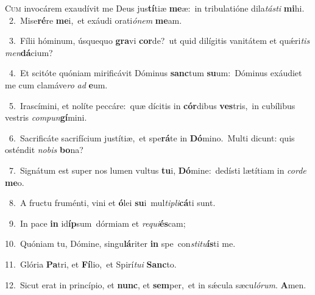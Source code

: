 \lettrine{\initial\textcolor{\initialcolor}{C}}{um} invocárem exaudívit me Deus jus\-\textbf{tí}\-tiæ \textbf{me}\-æ:~\star in tribulatióne dila\-\textit{tás}\-\textit{ti} \textbf{mi}\-hi.\\
{\numbfont\textcolor{\numbcolor}{~2.}}~Mise\-\textbf{ré}\-re \textbf{me}\-i,~\star et exáudi orati\-\textit{ó}\-\textit{nem} \textbf{me}\-am.\par
{\numbfont\textcolor{\numbcolor}{~3.}}~Fílii hóminum, úsquequo \textbf{gra}\-vi \textbf{cor}\-de?~\star ut quid dilígitis vanitátem et quǽri\textit{tis} \textit{men}\-\textbf{dá}cium?\par
{\numbfont\textcolor{\numbcolor}{~4.}}~Et scitóte quóniam mirificávit Dóminus \textbf{sanc}\-tum \textbf{su}\-um:~\star Dóminus exáudiet me cum clamáve\textit{ro} \textit{ad} \textbf{e}\-um.\par
{\numbfont\textcolor{\numbcolor}{~5.}}~Irascímini, et nolíte peccáre:~\dagger quæ dícitis in \textbf{cór}\-dibus \textbf{ves}\-tris,~\star in cubílibus vestris \textit{com}\-\textit{pun}\textbf{gí}mini.\par
{\numbfont\textcolor{\numbcolor}{~6.}}~Sacrificáte sacrifícium justítiæ,~\dagger et spe\-\textbf{rá}\-te in \textbf{Dó}\-mino.~\star Multi dicunt: quis osténdit \textit{no}\-\textit{bis} \textbf{bo}\-na?\par
{\numbfont\textcolor{\numbcolor}{~7.}}~Signátum est super nos lumen vultus \textbf{tu}\-i, \textbf{Dó}\-mine:~\star dedísti lætítiam in \textit{cor}\-\textit{de} \textbf{me}\-o.\par
{\numbfont\textcolor{\numbcolor}{~8.}}~A fructu fruménti, vini et \textbf{ó}\-lei \textbf{su}\-i~\star mul\-\textit{ti}\-\textit{pli}\textbf{cá}ti sunt.\par
{\numbfont\textcolor{\numbcolor}{~9.}}~In pace \textbf{in} id\-\textbf{íp}\-sum~\star dórmiam et \textit{re}\-\textit{qui}\textbf{és}cam;\par
{\numbfont\textcolor{\numbcolor}{10.}}~Quóniam tu, Dómine, singu\-\textbf{lá}\-riter \textbf{in} spe~\star con\-\textit{sti}\-\textit{tu}\textbf{ís}ti me.\par
{\numbfont\textcolor{\numbcolor}{11.}}~Glória \textbf{Pa}\-tri, et \textbf{Fí}\-lio,~\star et Spirí\-\textit{tu}\-\textit{i} \textbf{Sanc}\-to.\par
{\numbfont\textcolor{\numbcolor}{12.}}~Sicut erat in princípio, et \textbf{nunc}\-, et \textbf{sem}\-per,~\star et in sǽcula sæcu\-\textit{ló}\-\textit{rum}. \textbf{A}\-men.\par
